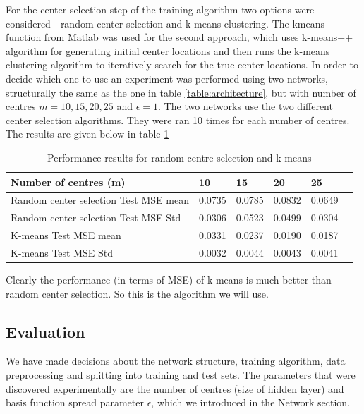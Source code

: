 \documentclass[a4paper, 11pt]{article}
\begin{document}
For the center selection step of the training algorithm two options were considered - random center selection and k-means clustering. The kmeans function from Matlab was used for the second approach, which uses k-means++ algorithm \cite{Arthur2007} for generating initial center locations and then runs the k-means clustering algorithm \cite{Lloyd82} to iteratively search for the true center locations. In order to decide which one to use an experiment was performed using two networks, structurally the same as the one in table \ref{table:architecture}, but with number of centres $m = 10, 15, 20, 25$ and $\epsilon = 1$. The two networks use the two different center selection algorithms. They were ran 10 times for each number of centres. The results are given below in table \ref{table:centermse}

\begin{table}[h]
\centering
\begin{tabular}{| l | l | l | l | l | l |}
\hline
Number of centres (m) & 10 & 15 & 20 & 25 \\
\hline
Random center selection Test MSE mean & 0.0735 & 0.0785 & 0.0832 & 0.0649 \\
\hline
Random center selection Test MSE Std & 0.0306 & 0.0523 & 0.0499 & 0.0304 \\
\hline
K-means Test MSE mean & 0.0331 & 0.0237 & 0.0190 & 0.0187 \\
\hline
K-means Test MSE Std & 0.0032 & 0.0044 & 0.0043 & 0.0041 \\
\hline
\end{tabular}
\caption{Performance results for random centre selection and k-means}
\label{table:centermse}
\end{table}


Clearly the performance (in terms of MSE) of k-means is much better than random center selection. So this is the algorithm we will use.

\subsection{Evaluation}
We have made decisions about the network structure, training algorithm, data preprocessing and splitting into training and test sets. The parameters that were discovered experimentally are the number of centres (size of hidden layer) and basis function spread parameter $\epsilon$, which we introduced in the Network section.
\end{document}
